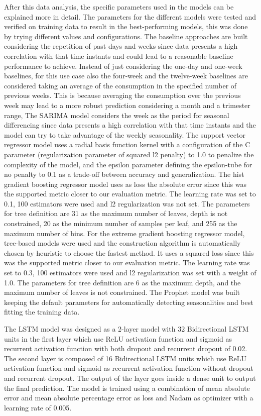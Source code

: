 After this data analysis, the specific parameters used in the models can be explained more in detail.
The parameters for the different models were tested and verified on training data to result in the best-performing models, this was done by trying different values and configurations.
The baseline approaches are built considering the repetition of past days and weeks since data presents a high correlation with that time instants and could lead to a reasonable baseline performance to achieve.
Instead of just considering the one-day and one-week baselines, for this use case also the four-week and the twelve-week baselines are considered taking an average of the consumption in the specified number of previous weeks.
This is because averaging the consumption over the previous week may lead to a more robust prediction considering a month and a trimester range,
The SARIMA model considers the week as the period for seasonal differencing since data presents a high correlation with that time instants and the model can try to take advantage of the weekly seasonality.
The support vector regressor model uses a radial basis function kernel with a configuration of the C parameter (regularization parameter of squared l2 penalty) to 1.0 to penalize the complexity of the model, and the epsilon parameter defining the epsilon-tube for no penalty to 0.1 as a trade-off between accuracy and generalization.
The hist gradient boosting regressor model uses as loss the absolute error since this was the supported metric closer to our evaluation metric.
The learning rate was set to 0.1, 100 estimators were used and l2 regularization was not set.
The parameters for tree definition are 31 as the maximum number of leaves, depth is not constrained, 20 as the minimum number of samples per leaf, and 255 as the maximum number of bins.
For the extreme gradient boosting regressor model, tree-based models were used and the construction algorithm is automatically chosen by heuristic to choose the fastest method.
It uses a squared loss since this was the supported metric closer to our evaluation metric.
The learning rate was set to 0.3, 100 estimators were used and l2 regularization was set with a weight of 1.0.
The parameters for tree definition are 6 as the maximum depth, and the maximum number of leaves is not constrained.
The Prophet model was built keeping the default parameters for automatically detecting seasonalities and best fitting the training data.

The LSTM model was designed as a 2-layer model with 32 Bidirectional LSTM units in the first layer which use ReLU activation function and sigmoid as recurrent activation function with both dropout and recurrent dropout of 0.02.
The second layer is composed of 16 Bidirectional LSTM units which use ReLU activation function and sigmoid as recurrent activation function without dropout and recurrent dropout.
The output of the layer goes inside a dense unit to output the final prediction.
The model is trained using a combination of mean absolute error and mean absolute percentage error as loss and Nadam as optimizer with a learning rate of 0.005.

